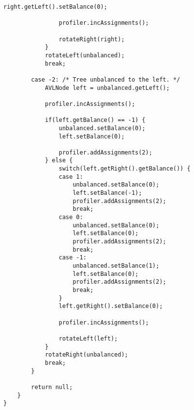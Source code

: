 \begin{lstlisting}[caption=AVL-Tree classes Source code - AVLTree]
				right.getLeft().setBalance(0);
				
				profiler.incAssignments();
				
				rotateRight(right);
			}
			rotateLeft(unbalanced);
			break;
			
		case -2: /* Tree unbalanced to the left. */
			AVLNode left = unbalanced.getLeft();
			
			profiler.incAssignments();
			
			if(left.getBalance() == -1) {
				unbalanced.setBalance(0);
				left.setBalance(0);
				
				profiler.addAssignments(2);
			} else {
				switch(left.getRight().getBalance()) {
				case 1:
					unbalanced.setBalance(0);
					left.setBalance(-1);
					profiler.addAssignments(2);
					break;
				case 0:
					unbalanced.setBalance(0);
					left.setBalance(0);
					profiler.addAssignments(2);
					break;
				case -1:
					unbalanced.setBalance(1);
					left.setBalance(0);
					profiler.addAssignments(2);
					break;
				}
				left.getRight().setBalance(0);
				
				profiler.incAssignments();
				
				rotateLeft(left);
			}
			rotateRight(unbalanced);
			break;
		}
		
		return null;
	}
}
\end{lstlisting}

